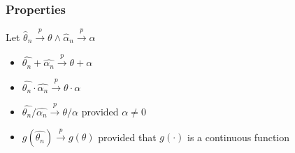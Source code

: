 \documentclass{article}
\theoremstyle{definition}
\theoremstyle{thrm}
\theoremstyle{lma}
\theoremstyle{ppst}
\theoremstyle{crlr}
\begin{document}
\subsubsection{Properties}
Let $\hat{\theta}_n\stackrel{p}{\to}\theta \wedge \hat{\alpha}_n\stackrel{p}{\to} \alpha$\\
\begin{itemize}
	\item $\hat{\theta_n}+\hat{\alpha_n}\stackrel{p}{\to} \theta+\alpha$
	\item $\hat{\theta_n}\cdot \hat{\alpha_n}\stackrel{p}{\to} \theta \cdot \alpha$
	\item $\hat{\theta_n}/\hat{\alpha_n}\stackrel{p}{\to} \theta/\alpha$ provided $\alpha \neq 0$
	\item $g(\hat{\theta_n})\stackrel{p}{\to}g(\theta)$ provided that $g(\cdot)$ is a continuous function
\end{itemize}
\end{document}
